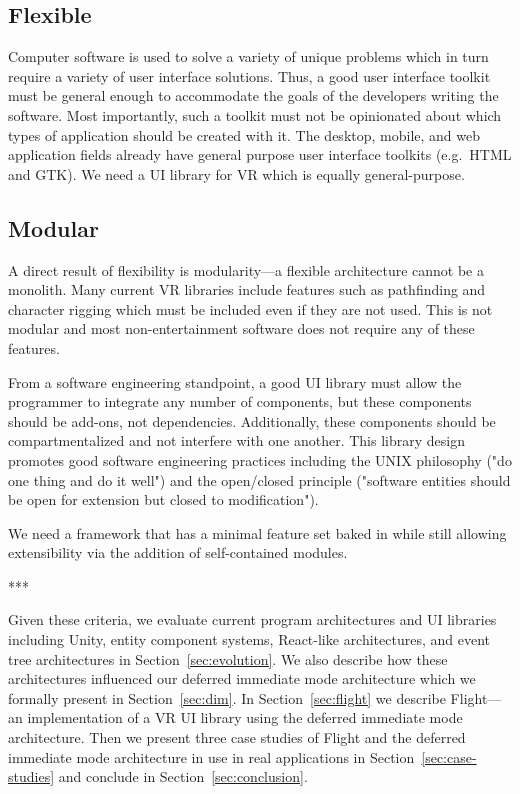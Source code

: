 \documentclass[conference,12pt]{IEEEtran}
\begin{document}
\subsection{Flexible}\label{sec:flexible}
Computer software is used to solve a variety of unique problems which in turn
require a variety of user interface solutions. Thus, a good user interface
toolkit must be general enough to accommodate the goals of the developers
writing the software. Most importantly, such a toolkit must not be opinionated
about which types of application should be created with it. The desktop, mobile,
and web application fields already have general purpose user interface toolkits
(e.g.\ HTML and GTK). We need a UI library for VR which is equally
general-purpose.

\subsection{Modular}\label{sec:modular}
A direct result of flexibility is modularity---a flexible architecture cannot be
a monolith. Many current VR libraries include features such as pathfinding and
character rigging which must be included even if they are not used. This is not
modular and most non-entertainment software does not require any of these
features.

From a software engineering standpoint, a good UI library must allow the
programmer to integrate any number of components, but these components should
be add-ons, not dependencies. Additionally, these components should be
compartmentalized and not interfere with one another. This library design
promotes good software engineering practices including the UNIX philosophy ("do
one thing and do it well") and the open/closed principle ("software entities
should be open for extension but closed to modification").

We need a framework that has a minimal feature set baked in while still allowing
extensibility via the addition of self-contained modules.

\begin{center}***\end{center}

Given these criteria, we evaluate current program architectures and UI libraries
including Unity, entity component systems, React-like architectures, and event
tree architectures in Section~\ref{sec:evolution}. We also describe how these
architectures influenced our deferred immediate mode architecture which we
formally present in Section~\ref{sec:dim}. In Section~\ref{sec:flight} we
describe Flight---an implementation of a VR UI library using the deferred
immediate mode architecture. Then we present three case studies of Flight and
the deferred immediate mode architecture in use in real applications in
Section~\ref{sec:case-studies} and conclude in Section~\ref{sec:conclusion}.
\end{document}
